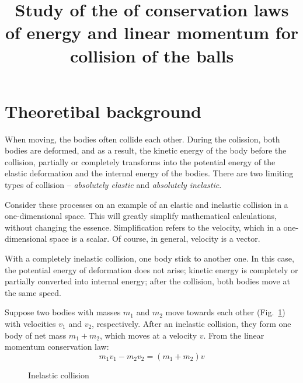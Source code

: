 \documentclass{LabWorkEng}
\title{Study of the of conservation laws of energy and linear momentum for collision of the balls}
\begin{document}
\writedatatofile{\jobname}
\maketitle

\nocite{IrodovMechanics, BerkeleyMechanics, FLF1, Holyday}
\printbibliography

\section{Theoretibal background}

When moving, the bodies often collide each other. During the colission, both bodies are deformed, and as a result, the kinetic energy of the body before the collision, partially or completely transforms into the potential energy of the elastic deformation and the internal energy of the bodies. There are two limiting types of collision -- \textit{absolutely elastic} and \textit{absolutely inelastic}.

Consider these processes on an example of an elastic and inelastic collision in a one-dimensional space. This will greatly simplify mathematical calculations, without changing the essence. Simplification refers to the velocity, which in a one-dimensional space is a scalar. Of course, in general, velocity is a vector.

With a completely inelastic collision, one body stick to another one. In this case, the potential energy of deformation does not arise; kinetic energy is completely or partially converted into internal energy; after the collision, both bodies move at the same speed.

Suppose two bodies with masses $m_1$ and $m_2$ move towards each other (Fig.~\ref{inelcoll}) with velocities $v_1$ and $v_2$, respectively. After an inelastic collision, they form one body of net mass $m_1 + m_2$, which moves at a velocity $v$. From the linear momentum conservation law:
\begin{equation}\label{1}
	m_1v_1 - m_2v_2 = (m_1 + m_2)v
\end{equation}

\begin{figure}\centering
	\begin{picbox}	
	\end{picbox}	
	\caption{Inelastic collision}
	\label{inelcoll}
\end{figure}
\end{document}
